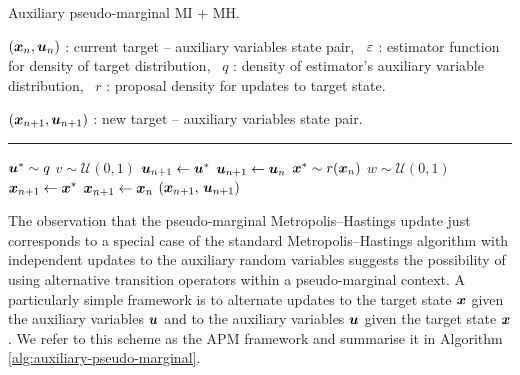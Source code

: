 \begin{algorithm}[!t]
\caption{Auxiliary pseudo-marginal MI + MH.}
\label{alg:auxiliary-pseudo-marginal-mi-mh}
\begin{algorithmic}
\small
    \Require
    $(\boldsymbol{x}_n, \boldsymbol{u}_n)$ : current target -- auxiliary variables state pair,~
    $\varepsilon$ : estimator function for density of target distribution,~
    $q$ : density of estimator's auxiliary variable distribution,~
    $r$ : proposal density for updates to target state.
    \Ensure\raggedright
    $(\boldsymbol{x}_{n+1}, \boldsymbol{u}_{n+1})$ : new target -- auxiliary variables state pair.
\end{algorithmic}
\hrule
\small
\begin{algorithmic}[1]
  \State $\boldsymbol{u}^* \sim q$ 
  \State $v \sim \mathcal{U}(0,1)$
    \State $\boldsymbol{u}_{n+1} \gets \boldsymbol{u}^*$
  \Else
    \State $\boldsymbol{u}_{n+1} \gets \boldsymbol{u}_n$
  \EndIf
  \State $\boldsymbol{x}^* \sim r(\boldsymbol{x}_n)$ 
  \State $w \sim \mathcal{U}(0,1)$
    \State $\boldsymbol{x}_{n+1} \gets \boldsymbol{x}^*$
  \Else
    \State  $\boldsymbol{x}_{n+1} \gets \boldsymbol{x}_n$
  \EndIf
  \State \Return $(\boldsymbol{x}_{n+1},\,\boldsymbol{u}_{n+1})$
\end{algorithmic}
\end{algorithm}

The observation that the pseudo-marginal Metropolis--Hastings update just corresponds to a special case of the standard Metropolis--Hastings algorithm with independent updates to the auxiliary random variables suggests the possibility of using alternative transition operators within a pseudo-marginal context. A particularly simple framework is to alternate updates to the target state $\boldsymbol{x}$ given the auxiliary variables $\boldsymbol{u}$ and to the auxiliary variables $\boldsymbol{u}$ given the target state $\boldsymbol{x}$. We refer to this scheme as the \ac{APM} framework and summarise it in Algorithm \ref{alg:auxiliary-pseudo-marginal}.

